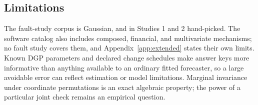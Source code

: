 \documentclass[11pt,a4paper]{article}
\begin{document}
\subsection{Limitations}

The fault-study corpus is Gaussian, and in Studies 1 and 2 hand-picked.
The software catalog also includes composed, financial, and multivariate
mechanisms; no fault study covers them, and Appendix~\ref{app:extended}
states their own limits. Known DGP parameters and declared change
schedules make answer keys more informative than anything available to an
ordinary fitted forecaster, so a large avoidable error can reflect
estimation or model limitations. Marginal invariance under coordinate
permutations is an exact algebraic property; the power of a particular
joint check remains an empirical question.
\end{document}
